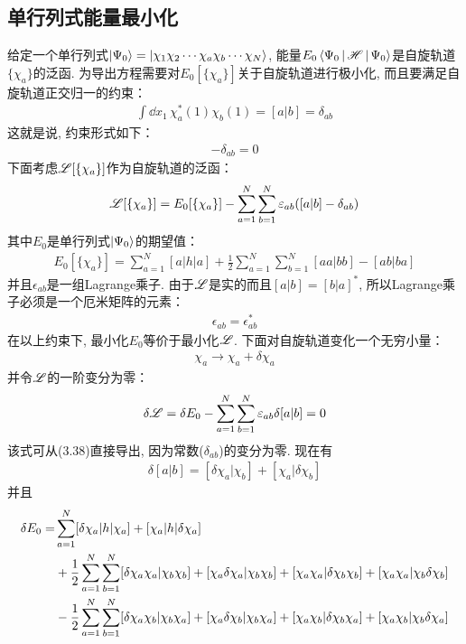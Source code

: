 \subsection{单行列式能量最小化}
给定一个单行列式$\Ket{\Psi_0} = \Ket{\chi_1\chi_2\cdots\chi_a\chi_b\cdots\chi_N}$, 
能量$E_0\Braket{\Psi_0|\mathscr{H}|\Psi_0}$是自旋轨道$\{\chi_a\}$的泛函. 
为导出\hft 方程需要对$E_0[\{\chi_a \}]$关于自旋轨道进行极小化, 
而且要满足自旋轨道正交归一的约束：
\begin{align}
	\int\dd{x}_1\,\chi_a^*(1)\chi_b(1) = [a|b] = \delta_{ab}
\end{align}
这就是说, 
约束形式如下：
\begin{align}
	[a|b] - \delta_{ab} = 0
\end{align}
下面考虑$\mathscr{L}[\{\chi_a \}]$作为自旋轨道的泛函：
\begin{align}
	\mathscr{L}[\{\chi_a \}] = E_0[\{\chi_a\}] - \sum_{a=1}^{N}\sum_{b=1}^{N}\varepsilon_{ab}([a|b]-\delta_{ab})
\end{align}
其中$E_0$是单行列式$\Ket{\Psi_0}$的期望值：
\begin{align}
	E_0[\{\chi_a\}] = \sum_{a=1}^{N}[a|h|a] + \frac{1}{2}\sum_{a=1}^{N}\sum_{b=1}^{N}[aa|bb]- [ab|ba]
\end{align}
并且$\epsilon_{ab}$是一组Lagrange乘子. 
由于$\mathscr{L}$是实的而且$[a|b]=[b|a]^*$, 
所以Lagrange乘子必须是一个厄米矩阵的元素：
\begin{align}
	\label{3.40}
	\epsilon_{ab} = \epsilon_{ab}^*
\end{align}
在以上约束下, 
最小化$E_0$等价于最小化$\mathscr{L}$. 
下面对自旋轨道变化一个无穷小量：
\begin{align}
	\chi_a \to \chi_a+\delta\chi_a
\end{align}
并令$\mathscr{L}$的一阶变分为零：
\begin{align}
	\delta\mathscr{L} = \delta E_0 - \sum_{a=1}^{N}\sum_{b=1}^{N}\varepsilon_{ab}\delta[a|b] = 0
\end{align}
该式可从(3.38)直接导出, 
因为常数($\delta_{ab}$)的变分为零. 
现在有
\begin{align}
	\delta[a|b] = [\delta\chi_a|\chi_b] + [\chi_a|\delta\chi_b]
\end{align}
并且
\begin{align}
	\delta E_0 = & \sum_{a=1}^{N}[\delta\chi_a|h|\chi_a] + [\chi_a|h|\delta\chi_a]\notag\\
	& + \frac{1}{2}\sum_{a=1}^{N}\sum_{b=1}^{N}[\delta\chi_a\chi_a|\chi_b\chi_b] + [\chi_a\delta\chi_a|\chi_b\chi_b] + [\chi_a\chi_a|\delta\chi_b\chi_b] + [\chi_a\chi_a|\chi_b\delta\chi_b]\notag\\
	& - \frac{1}{2}\sum_{a=1}^{N}\sum_{b=1}^{N}[\delta\chi_a\chi_b|\chi_b\chi_a] + [\chi_a\delta\chi_b|\chi_b\chi_a] + [\chi_a\chi_b|\delta\chi_b\chi_a] + [\chi_a\chi_b|\chi_b\delta\chi_a]
\end{align}
